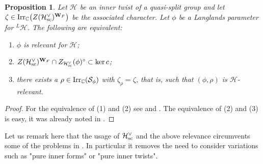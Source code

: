 \documentclass[11pt]{amsart}
\newtheorem{prop}[thm]{Proposition}
\theoremstyle{definition}
\newcommand{\mb}{\mathbf}
\newcommand{\C}{\mathbb C}
\def\Irr{{\rm Irr}}
\def\cS{{\mathcal S}}
\def\cH{{\mathcal H}}
\def\sc{{\rm sc}}
\begin{document}
\begin{prop}\label{prop:7.10}
Let $\cH$ be an inner twist of a quasi-split group and let $\zeta \in \Irr_\C 
\big( Z (\cH^\vee_{\sc})^{\mb W_F} \big)$ be the associated character.
Let $\phi$ be a Langlands parameter for ${}^L \cH$. The following are
equivalent:
\begin{enumerate}
\item $\phi$ is relevant for $\cH$;
\item $Z (\cH^\vee_{\sc})^{\mb W_F} \cap Z_{\cH^\vee_{\sc}}(\phi)^\circ 
\subset \ker c$;
\item there exists a $\rho \in \Irr_\C (\cS_\phi)$ with $\zeta_\rho = 
\zeta$, that is, such that $(\phi,\rho)$ is $\cH$-relevant.
\end{enumerate}
\end{prop}
\begin{proof}
For the equivalence of (1) and (2) see \cite[Lemma 9.1]{HiSa} and 
\cite[Corollary 2.3]{Art1}. The equivalence of (2) and (3) is easy, it
was already noted in \cite[Proposition 1.6]{ABPS7}. 
\end{proof}

Let us remark here that the usage of $\cH^\vee_{\sc}$ and the above relevance 
circumvents some of the problems in \cite[\S 2]{Vog}. In particular it removes 
the need to consider variations such as "pure inner forms" or "pure inner twists".
\end{document}
